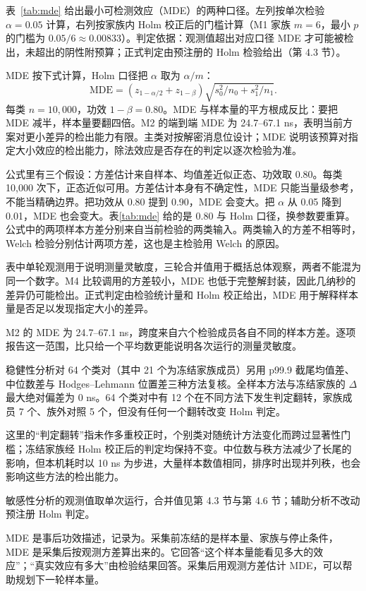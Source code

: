 表~\ref{tab:mde} 给出最小可检测效应（MDE）的两种口径。左列按单次检验 $\alpha=0.05$ 计算，右列按家族内 Holm 校正后的门槛计算（M1 家族 $m=6$，最小 $p$ 的门槛为 $0.05/6\approx0.00833$）。判定依据：观测值超出对应口径 MDE 才可能被检出，未超出的阴性附预算；正式判定由预注册的 Holm 检验给出（第 4.3 节）。

MDE 按下式计算，Holm 口径把 $\alpha$ 取为 $\alpha/m$：
\begin{equation}\tag{4.1}
\mathrm{MDE} = (z_{1-\alpha/2}+z_{1-\beta})\sqrt{s_0^2/n_0+s_1^2/n_1}.
\end{equation}
每类 $n=10{,}000$，功效 $1-\beta=0.80$。MDE 与样本量的平方根成反比：要把 MDE 减半，样本量要翻四倍。M2 的端到端 MDE 为 24.7--67.1 ns，表明当前方案对更小差异的检出能力有限。主类对按解密消息位设计；MDE 说明该预算对指定大小效应的检出能力，除法效应是否存在的判定以逐次检验为准。%

公式里有三个假设：方差估计来自样本、均值差近似正态、功效取 0.80。每类 10,000 次下，正态近似可用。方差估计本身有不确定性，MDE 只能当量级参考，不能当精确边界。把功效从 0.80 提到 0.90，MDE 会变大。把 $\alpha$ 从 0.05 降到 0.01，MDE 也会变大。表\ref{tab:mde} 给的是 0.80 与 Holm 口径，换参数要重算。公式中的两项样本方差分别来自当前检验的两类输入。两类输入的方差不相等时，Welch 检验分别估计两项方差，这也是主检验用 Welch 的原因。

表中单轮观测用于说明测量灵敏度，三轮合并值用于概括总体观察，两者不能混为同一个数字。M4 比较调用的方差较小，MDE 也低于完整解封装，因此几纳秒的差异仍可能检出。正式判定由检验统计量和 Holm 校正给出，MDE 用于解释样本量是否足以发现指定大小的差异。

M2 的 MDE 为 24.7--67.1 ns，跨度来自六个检验成员各自不同的样本方差。逐项报告这一范围，比只给一个平均数更能说明各次运行的测量灵敏度。

稳健性分析对 64 个类对（其中 21 个为冻结家族成员）另用 p99.9 截尾均值差、中位数差与 Hodges--Lehmann 位置差三种方法复核。全样本方法与冻结家族的 $\Delta$ 最大绝对偏差为 0 ns。64 个类对中有 12 个在不同方法下发生判定翻转，家族成员 7 个、族外对照 5 个，但没有任何一个翻转改变 Holm 判定。%

这里的“判定翻转”指未作多重校正时，个别类对随统计方法变化而跨过显著性门槛；冻结家族经 Holm 校正后的判定均保持不变。中位数与秩方法减少了长尾的影响，但本机耗时以 10 ns 为步进，大量样本数值相同，排序时出现并列秩，也会影响这些方法的检出能力。


敏感性分析的观测值取单次运行，合并值见第 4.3 节与第 4.6 节；辅助分析不改动预注册 Holm 判定。

MDE 是事后功效描述，记录为。采集前冻结的是样本量、家族与停止条件，MDE 是采集后按观测方差算出来的。它回答“这个样本量能看见多大的效应”；“真实效应有多大”由检验结果回答。采集后用观测方差估计 MDE，可以帮助规划下一轮样本量。

